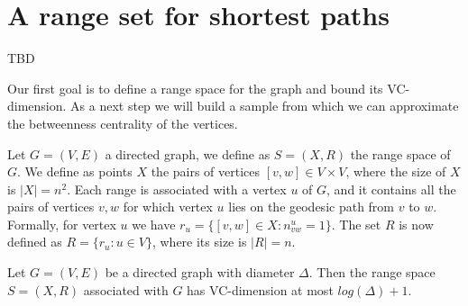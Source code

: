 \section{A range set for shortest paths}\label{sec:rangeset}
\XXX TBD

Our first goal is to define a range space for the graph and bound its VC-dimension.
As a next step we will build a sample from which we can approximate the betweenness centrality of the vertices.

Let $G=(V,E)$ a directed graph, we define as $S=(X,R)$ the range space of $G$.
We define as points $X$ the pairs of vertices $[v,w]\in V\times V$, where the size of $X$ is $|X|=n^2$.
Each range is associated with a vertex $u$ of $G$, and it contains all the pairs of vertices $v,w$ for which vertex $u$ lies on the geodesic path from $v$ to $w$.
Formally, for vertex $u$ we have $r_{u}=\{[v,w]\in X: n_{vw}^{u}=1\}$.
The set $R$ is now defined as $R=\{r_{u}:u\in V\}$, where its size is $|R|=n$.

\begin{theorem}
Let $G=(V,E)$ be a directed graph with diameter $\Delta$. Then the range space $S=(X,R)$ associated with $G$ has VC-dimension at most $log(\Delta)+1$.
\end{theorem}

